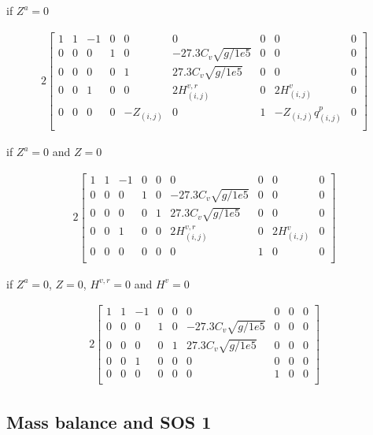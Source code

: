 if $Z^a = 0$

\begin{alignat}{2}
    \begin{bmatrix}
        1 & 1 & -1                  & 0 & 0 & 0 & 0 & 0 & 0\\
        0 & 0 & 0                   & 1 & 0 & -27.3C_v \sqrt{g/1e5} & 0 & 0 & 0\\
        0 & 0 & 0                   & 0 & 1 & 27.3C_v \sqrt{g/1e5} & 0 & 0 & 0\\
        0 & 0 & 1   & 0 & 0 & 2H^{v,r}_{(i,j)} & 0 & 2H^v_{(i,j)} & 0  \\
        0 & 0 & 0                   & 0 & -Z_{(i,j)} & 0 & 1 & - Z_{(i,j)}q^p_{(i,j)} & 0\\
    \end{bmatrix}
\end{alignat}

if $Z^a = 0$ and $Z = 0$

\begin{alignat}{2}
    \begin{bmatrix}
        1 & 1 & -1                  & 0 & 0 & 0 & 0 & 0 & 0\\
        0 & 0 & 0                   & 1 & 0 & -27.3C_v \sqrt{g/1e5} & 0 & 0 & 0\\
        0 & 0 & 0                   & 0 & 1 & 27.3C_v \sqrt{g/1e5} & 0 & 0 & 0\\
        0 & 0 & 1   & 0 & 0 & 2H^{v,r}_{(i,j)} & 0 & 2H^v_{(i,j)} & 0  \\
        0 & 0 & 0                   & 0 & 0 & 0 & 1 & 0 & 0\\
    \end{bmatrix}
\end{alignat}

if $Z^a = 0$, $Z = 0$, $H^{v,r}=0$ and $H^v=0$

\begin{alignat}{2}
    \begin{bmatrix}
        1 & 1 & -1 & 0 & 0 & 0 & 0 & 0 & 0\\
        0 & 0 & 0 & 1 & 0 & -27.3C_v \sqrt{g/1e5} & 0 & 0 & 0\\
        0 & 0 & 0 & 0 & 1 & 27.3C_v \sqrt{g/1e5} & 0 & 0 & 0\\
        0 & 0 & 1 & 0 & 0 & 0 & 0 & 0 & 0  \\
        0 & 0 & 0 & 0 & 0 & 0 & 1 & 0 & 0\\
    \end{bmatrix}
\end{alignat}
\subsection{Mass balance and SOS 1}

